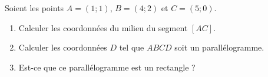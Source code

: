 
\begin{exercice}\label{exosmath-0507}

    Soient les points \( A=(1;1)\), \( B=(4;2)\) et \( C=(5;0)\).
    \begin{enumerate}
        \item
            Calculer les coordonnées du milieu du segment \( [AC]\).
        \item
            Calculer les coordonnées \( D\) tel que \( ABCD\) soit un parallélogramme.
        \item
            Est-ce que ce parallélogramme est un rectangle ?
    \end{enumerate}

\end{exercice}
